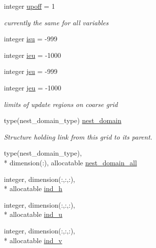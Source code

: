 \begin{DoxyCompactItemize}
\item 
integer \hyperlink{structfv__arrays__mod_1_1fv__nest__type_ae71ff140cce3e6bee7ffd0f4c82da439}{upoff} = 1
\begin{DoxyCompactList}\small\item\em currently the same for all variables \end{DoxyCompactList}\item 
integer \hyperlink{structfv__arrays__mod_1_1fv__nest__type_a00e4c8056d2cdb4d365658f28b224db0}{isu} = -\/999
\item 
integer \hyperlink{structfv__arrays__mod_1_1fv__nest__type_abf7c9c0bc141c25e6780cfb7fdf2c61a}{ieu} = -\/1000
\item 
integer \hyperlink{structfv__arrays__mod_1_1fv__nest__type_a3ff9370e06722ce089be75bbe4ddc870}{jsu} = -\/999
\item 
integer \hyperlink{structfv__arrays__mod_1_1fv__nest__type_acd802c1e3bcabb89e088cf208df03909}{jeu} = -\/1000
\begin{DoxyCompactList}\small\item\em limits of update regions on coarse grid \end{DoxyCompactList}\item 
type(nest\-\_\-domain\-\_\-type) \hyperlink{structfv__arrays__mod_1_1fv__nest__type_a2f7e06880fd4717d1aec364d3de4a2d3}{nest\-\_\-domain}
\begin{DoxyCompactList}\small\item\em Structure holding link from this grid to its parent. \end{DoxyCompactList}\item 
type(nest\-\_\-domain\-\_\-type), \\*
dimension(\-:), allocatable \hyperlink{structfv__arrays__mod_1_1fv__nest__type_a4b80c11edd90aa8ba757f5d11d8031d1}{nest\-\_\-domain\-\_\-all}
\item 
integer, dimension(\-:,\-:,\-:), \\*
allocatable \hyperlink{structfv__arrays__mod_1_1fv__nest__type_aca2c6b35886f7d7de3d0f1b37c0bef1e}{ind\-\_\-h}
\item 
integer, dimension(\-:,\-:,\-:), \\*
allocatable \hyperlink{structfv__arrays__mod_1_1fv__nest__type_a45020a146430029b2aecfae4d0c3836e}{ind\-\_\-u}
\item 
integer, dimension(\-:,\-:,\-:), \\*
allocatable \hyperlink{structfv__arrays__mod_1_1fv__nest__type_a99e3c5ac558d6680d13abecdb19d42d6}{ind\-\_\-v}
\item 

\end{DoxyCompactItemize}
